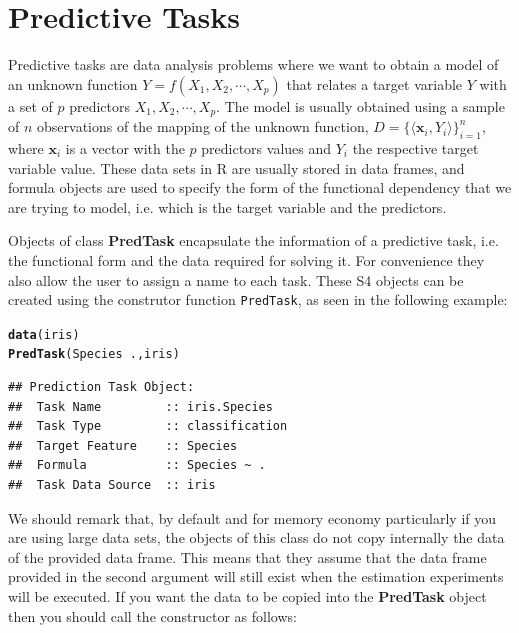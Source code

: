 \documentclass[10pt,a4paper]{article}\usepackage[]{graphicx}\usepackage[]{color}
\makeatletter
\newcommand{\hlopt}[1]{\textcolor[rgb]{0,0,0}{#1}}%
\newcommand{\hlstd}[1]{\textcolor[rgb]{0.345,0.345,0.345}{#1}}%
\newcommand{\hlkwd}[1]{\textcolor[rgb]{0.737,0.353,0.396}{\textbf{#1}}}%
\newenvironment{kframe}{%
 \def\at@end@of@kframe{}%
 \ifinner\ifhmode%
  \def\at@end@of@kframe{\end{minipage}}%
  \begin{minipage}{\columnwidth}%
 \fi\fi%
 \def\FrameCommand##1{\hskip\@totalleftmargin \hskip-\fboxsep
 \colorbox{shadecolor}{##1}\hskip-\fboxsep
     \hskip-\linewidth \hskip-\@totalleftmargin \hskip\columnwidth}%
 \MakeFramed {\advance\hsize-\width
   \@totalleftmargin\z@ \linewidth\hsize
   \@setminipage}}%
 {\par\unskip\endMakeFramed%
 \at@end@of@kframe}
\newenvironment{knitrout}{}{} %
\makeatother
\begin{document}
\section{Predictive Tasks}

Predictive tasks are data analysis problems where we want to obtain a
model of an unknown function $Y=f(X_1, X_2, \cdots, X_p)$ that relates
a target variable $Y$ with a set of $p$ predictors $X_1, X_2, \cdots,
X_p$. The model is usually obtained using a sample of $n$ observations
of the mapping of the unknown function, $D=\{\langle \mathbf{x}_i,
Y_i\rangle\}_{i=1}^n$, where $\mathbf{x}_i$ is a vector with the $p$
predictors values and $Y_i$ the respective target variable value.  These data sets in R are usually stored in data
frames, and formula objects are used to specify the form of the
functional dependency that we are trying to model, i.e. which is the
target variable and the predictors.

Objects of class \textbf{PredTask} encapsulate the information of a
predictive task, i.e. the functional form and the data required for
solving it. For convenience they also allow the user to assign a name
to each task. These S4 objects can be created using the construtor
function \texttt{PredTask}, as seen in the following example:

\begin{knitrout}\footnotesize
{}\color{fgcolor}\begin{kframe}
\begin{alltt}
\hlkwd{data}\hlstd{(iris)}
\hlkwd{PredTask}\hlstd{(Species} \hlopt{~} \hlstd{.,iris)}
\end{alltt}
\begin{verbatim}
## Prediction Task Object:
## 	Task Name         :: iris.Species 
## 	Task Type         :: classification 
## 	Target Feature    :: Species 
## 	Formula           :: Species ~ .
## 	Task Data Source  :: iris
\end{verbatim}
\end{kframe}
\end{knitrout}

We should remark that, by default and for memory economy particularly if you are using large data sets, the objects of this class do not copy internally the data of the provided data frame. This  means that they assume that the data frame provided in the second argument will still exist when the estimation experiments will be executed. If you want the data to be copied into the \textbf{PredTask} object then you should call the constructor as follows:
\end{document}
